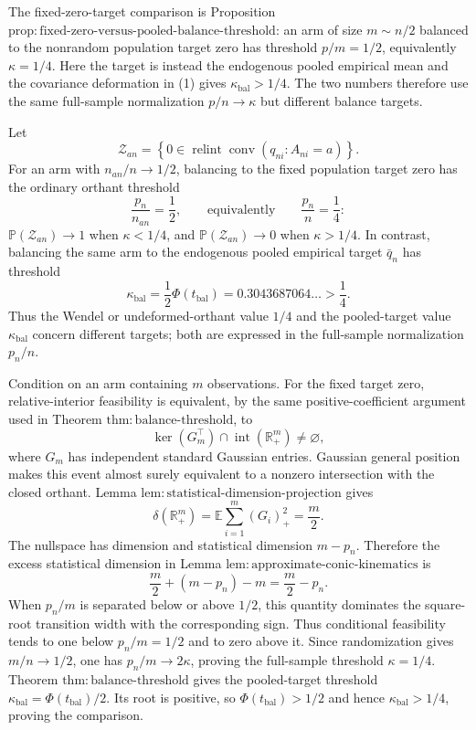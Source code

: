 The fixed-zero-target comparison is Proposition \(\mathrm{prop{:}fixed\mbox{-}zero\mbox{-}versus\mbox{-}pooled\mbox{-}balance\mbox{-}threshold}\): an arm of size \(m\sim n/2\) balanced to the nonrandom population target zero has threshold \(p/m=1/2\), equivalently \(\kappa=1/4\).  Here the target is instead the endogenous pooled empirical mean and the covariance deformation in (1) gives \(\kappa_{\mathrm{bal}}>1/4\).  The two numbers therefore use the same full-sample normalization \(p/n\to\kappa\) but different balance targets.

Let
\[
 \mathcal Z_{an}=\left\{0\in\operatorname{relint}
 \operatorname{conv}(q_{ni}:A_{ni}=a)\right\}.
\]
For an arm with \(n_{an}/n\to1/2\), balancing to the fixed population target zero has the ordinary orthant threshold
\[
 \frac{p_n}{n_{an}}=\frac12,
 \qquad\text{equivalently}\qquad \frac{p_n}{n}=\frac14:
\]
\(\mathbb P(\mathcal Z_{an})\to1\) when \(\kappa<1/4\), and \(\mathbb P(\mathcal Z_{an})\to0\) when \(\kappa>1/4\).  In contrast, balancing the same arm to the endogenous pooled empirical target \(\bar q_n\) has threshold
\[
 \kappa_{\mathrm{bal}}=\frac12\Phi(t_{\mathrm{bal}})
 =0.3043687064\ldots>\frac14.
\]
Thus the Wendel or undeformed-orthant value \(1/4\) and the pooled-target value \(\kappa_{\mathrm{bal}}\) concern different targets; both are expressed in the full-sample normalization \(p_n/n\).

Condition on an arm containing \(m\) observations.  For the fixed target zero, relative-interior feasibility is equivalent, by the same positive-coefficient argument used in Theorem \(\mathrm{thm{:}balance\mbox{-}threshold}\), to
\[
 \ker(G_m^\top)\cap\operatorname{int}(\mathbb R_+^m)\ne\varnothing,
\]
where \(G_m\) has independent standard Gaussian entries.  Gaussian general position makes this event almost surely equivalent to a nonzero intersection with the closed orthant.  Lemma \(\mathrm{lem{:}statistical\mbox{-}dimension\mbox{-}projection}\) gives
\[
 \delta(\mathbb R_+^m)
 =\mathbb E\sum_{i=1}^m(G_i)_+^2
 =\frac m2.
\]
The nullspace has dimension and statistical dimension \(m-p_n\).  Therefore the excess statistical dimension in Lemma \(\mathrm{lem{:}approximate\mbox{-}conic\mbox{-}kinematics}\) is
\[
 \frac m2+(m-p_n)-m=\frac m2-p_n.
\]
When \(p_n/m\) is separated below or above \(1/2\), this quantity dominates the square-root transition width with the corresponding sign.  Thus conditional feasibility tends to one below \(p_n/m=1/2\) and to zero above it.  Since randomization gives \(m/n\to1/2\), one has \(p_n/m\to2\kappa\), proving the full-sample threshold \(\kappa=1/4\).  Theorem \(\mathrm{thm{:}balance\mbox{-}threshold}\) gives the pooled-target threshold \(\kappa_{\mathrm{bal}}=\Phi(t_{\mathrm{bal}})/2\).  Its root is positive, so \(\Phi(t_{\mathrm{bal}})>1/2\) and hence \(\kappa_{\mathrm{bal}}>1/4\), proving the comparison.

